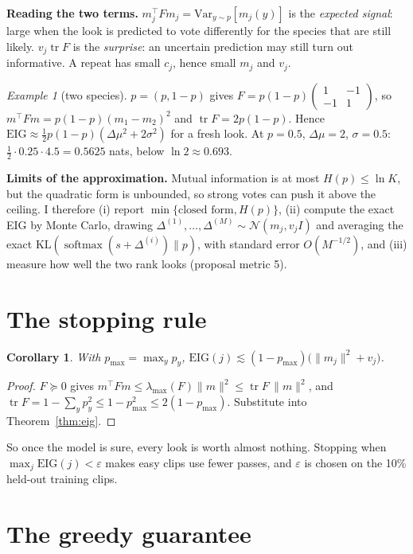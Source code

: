 \documentclass[11pt]{article}
\theoremstyle{plain}
\newtheorem{cor}[prop]{Corollary}
\theoremstyle{remark}
\newtheorem*{ex}{Example}
\newcommand{\EIG}{\mathrm{EIG}}
\newcommand{\KL}{\mathrm{KL}}
\newcommand{\Var}{\mathrm{Var}}
\newcommand{\tr}{\operatorname{tr}}
\begin{document}
\textbf{Reading the two terms.} $m_j^\top Fm_j=\Var_{y\sim p}[m_j(y)]$ is the \emph{expected signal}: large when the look is predicted to vote differently for the species that are still likely. $v_j\tr F$ is the \emph{surprise}: an uncertain prediction may still turn out informative. A repeat has small $c_j$, hence small $m_j$ and $v_j$.

\begin{ex}[two species]
$p=(p,1-p)$ gives $F=p(1-p)\begin{pmatrix}1&-1\\-1&1\end{pmatrix}$, so $m^\top Fm=p(1-p)(m_1-m_2)^2$ and $\tr F=2p(1-p)$. Hence $\EIG\approx\frac12p(1-p)(\Delta\mu^2+2\sigma^2)$ for a fresh look. At $p=0.5$, $\Delta\mu=2$, $\sigma=0.5$: $\frac12\cdot0.25\cdot4.5=0.5625$ nats, below $\ln2\approx0.693$.
\end{ex}

\textbf{Limits of the approximation.} Mutual information is at most $H(p)\le\ln K$, but the quadratic form is unbounded, so strong votes can push it above the ceiling. I therefore (i) report $\min\{\text{closed form},H(p)\}$, (ii) compute the exact EIG by Monte Carlo, drawing $\Delta^{(1)},\dots,\Delta^{(M)}\sim\mathcal N(m_j,v_jI)$ and averaging the exact $\KL(\operatorname{softmax}(s+\Delta^{(i)})\|p)$, with standard error $O(M^{-1/2})$, and (iii) measure how well the two rank looks (proposal metric 5).

\section{The stopping rule}

\begin{cor}\label{cor:stop}
With $p_{\max}=\max_y p_y$, $\EIG(j)\lesssim(1-p_{\max})\big(\|m_j\|^2+v_j\big)$.
\end{cor}
\begin{proof}
$F\succeq0$ gives $m^\top Fm\le\lambda_{\max}(F)\|m\|^2\le\tr F\,\|m\|^2$, and $\tr F=1-\sum_yp_y^2\le1-p_{\max}^2\le2(1-p_{\max})$. Substitute into Theorem~\ref{thm:eig}.
\end{proof}
So once the model is sure, every look is worth almost nothing. Stopping when $\max_j\EIG(j)<\varepsilon$ makes easy clips use fewer passes, and $\varepsilon$ is chosen on the 10\% held-out training clips.

\section{The greedy guarantee}
\end{document}
